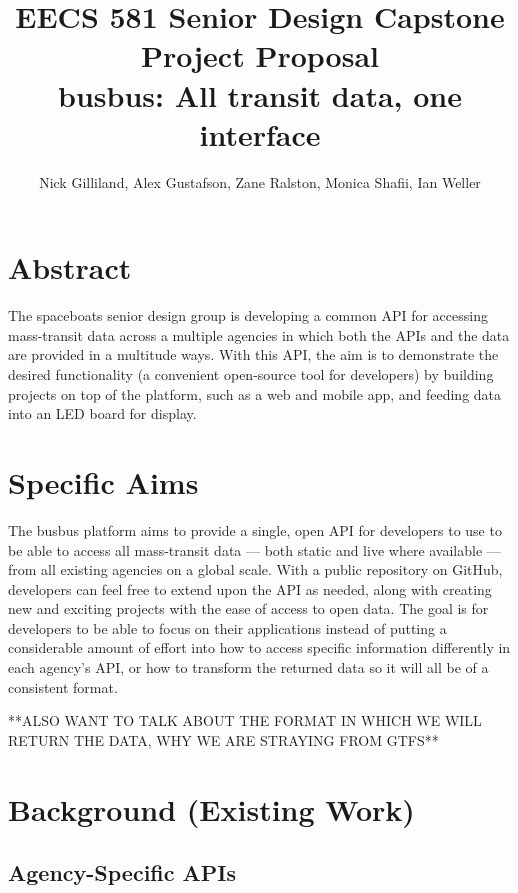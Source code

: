\documentclass[12pt]{article}
\title{EECS 581 Senior Design Capstone Project Proposal \\
busbus: All transit data, one interface}
\author{Nick Gilliland, Alex Gustafson, Zane Ralston, Monica Shafii, Ian Weller}
\begin{document}
\maketitle

\section{Abstract}

The spaceboats senior design group is developing a common API for accessing mass-transit data
across a multiple agencies in which both the APIs and the data are provided in a multitude ways. 
With this API, the aim is to demonstrate the desired functionality (a convenient open-source tool 
for developers) by building projects on top of the platform, such as a web and mobile app, and 
feeding data into an LED board for display.

\section{Specific Aims}

The busbus platform aims to provide a single, open API for developers to use to be able to access all
mass-transit data --- both static and live where available --- from all existing agencies on a global scale.
With a public repository on GitHub, developers can feel free to extend upon the API as needed,
along with creating new and exciting projects with the ease of access to open data. The goal is for
developers to be able to focus on their applications instead of putting a considerable amount of
effort into how to access specific information differently in each agency's API, or how to transform
the returned data so it will all be of a consistent format.

**ALSO WANT TO TALK ABOUT THE FORMAT IN WHICH WE WILL RETURN THE DATA, WHY WE
ARE STRAYING FROM GTFS**

\section{Background (Existing Work)}
\subsection{Agency-Specific APIs}
\end{document}
